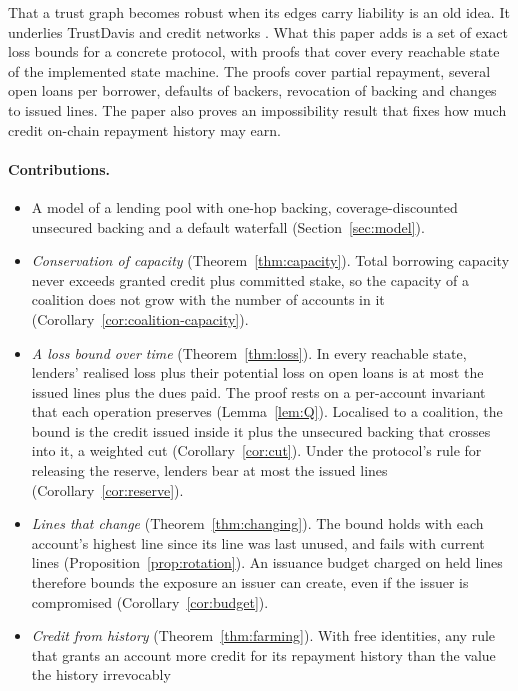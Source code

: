 \documentclass[acmsmall,nonacm,screen]{acmart}
\theoremstyle{acmdefinition}%
\begin{document}
That a trust graph becomes robust when its edges carry liability is an old idea. It underlies
TrustDavis \citep{defigueiredo2005trustdavis} and credit networks
\citep{ghosh2007trust,karlan2009trust,dandekar2011liquidity}. What this paper adds is a set of exact
loss bounds for a concrete protocol, with proofs that cover every reachable state of the
implemented state machine. The proofs cover partial repayment, several open loans per borrower,
defaults of backers, revocation of backing and changes to issued lines. The paper also proves an
impossibility result that fixes how much credit on-chain repayment history may earn.

\paragraph{Contributions.}
\begin{itemize}
\item A model of a lending pool with one-hop backing, coverage-discounted unsecured backing and a
  default waterfall (Section~\ref{sec:model}).
\item \emph{Conservation of capacity} (Theorem~\ref{thm:capacity}). Total borrowing capacity never
  exceeds granted credit plus committed stake, so the capacity of a coalition does not grow with
  the number of accounts in it (Corollary~\ref{cor:coalition-capacity}).
\item \emph{A loss bound over time} (Theorem~\ref{thm:loss}). In every reachable state, lenders'
  realised loss plus their potential loss on open loans is at most the issued lines plus the dues
  paid. The proof rests on a per-account invariant that each operation preserves
  (Lemma~\ref{lem:Q}). Localised to a coalition, the bound is the credit issued inside it plus the
  unsecured backing that crosses into it, a weighted cut (Corollary~\ref{cor:cut}). Under the
  protocol's rule for releasing the reserve, lenders bear at most the issued lines
  (Corollary~\ref{cor:reserve}).
\item \emph{Lines that change} (Theorem~\ref{thm:changing}). The bound holds with each account's
  highest line since its line was last unused, and fails with current lines
  (Proposition~\ref{prop:rotation}). An issuance budget charged on held lines therefore bounds the
  exposure an issuer can create, even if the issuer is compromised (Corollary~\ref{cor:budget}).
\item \emph{Credit from history} (Theorem~\ref{thm:farming}). With free identities, any rule that
  grants an account more credit for its repayment history than the value the history irrevocably

\end{itemize}
\end{document}
